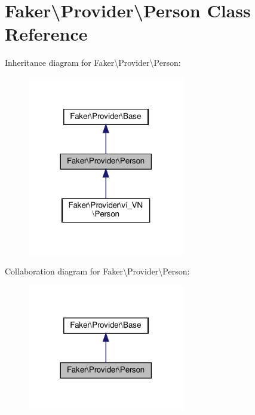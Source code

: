 \hypertarget{classFaker_1_1Provider_1_1Person}{}\section{Faker\textbackslash{}Provider\textbackslash{}Person Class Reference}
\label{classFaker_1_1Provider_1_1Person}


Inheritance diagram for Faker\textbackslash{}Provider\textbackslash{}Person\+:\nopagebreak
\begin{figure}[H]
\begin{center}
\leavevmode
\includegraphics[width=194pt]{classFaker_1_1Provider_1_1Person__inherit__graph}
\end{center}
\end{figure}


Collaboration diagram for Faker\textbackslash{}Provider\textbackslash{}Person\+:\nopagebreak
\begin{figure}[H]
\begin{center}
\leavevmode
\includegraphics[width=194pt]{classFaker_1_1Provider_1_1Person__coll__graph}
\end{center}
\end{figure}
